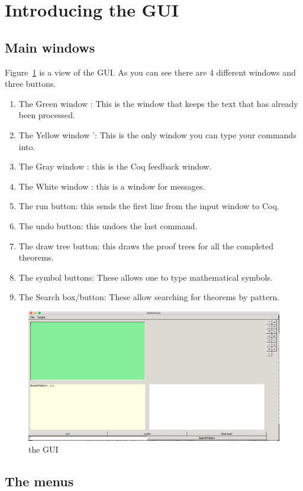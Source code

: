 \section{Introducing the GUI}
\subsection{Main windows}
Figure~\ref{first look} is a view of the GUI. As you can see there are 4 different windows and three buttons.
\begin{enumerate}
\item The Green window  : This is the window that keeps the text that has already been processed.
\item The Yellow window ': This is the only window you can type your commands into.
\item The Gray  window : this is the Coq feedback window. 
\item The White window : this is a window for messages.
\item The run button: this sends the first line from the input window to Coq.
\item The undo button: this undoes the last command.
\item The draw tree button: this draws the proof trees for all the completed theorems.
\item The symbol buttons: These allows one to type mathematical symbols.
\item The Search box/button: These allow searching for theorems by pattern.
\end{enumerate}


\begin{figure}[h!]
\includegraphics[scale=0.3]{Installation/main.png}
\caption{the GUI}\label{first look}
\end{figure}
\subsection{The menus}

